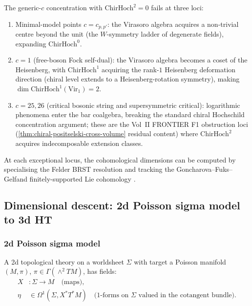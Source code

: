 \begin{remark}
\label{rem:vir-concentration-exceptions}
The generic-$c$ concentration with $\mathrm{ChirHoch}^2 = 0$ fails
at three loci:
\begin{enumerate}[label=\textup{(\alph*)}]
\item Minimal-model points $c = c_{p, p'}$: the Virasoro algebra
acquires a non-trivial centre beyond the unit \textup(the
$W$-symmetry ladder of degenerate fields\textup), expanding
$\mathrm{ChirHoch}^0$.
\item $c = 1$ \textup(free-boson Fock self-dual\textup): the
Virasoro algebra becomes a coset of the Heisenberg, with
$\mathrm{ChirHoch}^1$ acquiring the rank-$1$ Heisenberg deformation
direction \textup(chiral level extends to a Heisenberg-rotation
symmetry\textup), making
$\dim \mathrm{ChirHoch}^1(\mathrm{Vir}_1) = 2$.
\item $c = 25, 26$ \textup(critical bosonic string and supersymmetric
critical\textup): logarithmic phenomena enter the bar coalgebra,
breaking the standard chiral Hochschild concentration argument;
these are the Vol~II FRONTIER F1 obstruction loci
\textup(\cref{thm:chiral-positselski-cross-volume} residual
content\textup) where $\mathrm{ChirHoch}^2$ acquires
indecomposable extension classes.
\end{enumerate}
At each exceptional locus, the cohomological dimensions can be
computed by specialising the Felder BRST resolution
\cite{Felder1989} and tracking the Goncharova--Fuks--Gelfand
finitely-supported Lie cohomology
\cite{FuksGelfand1980,Goncharova1973}.
\end{remark}

\subsection{Dimensional descent: 2d Poisson sigma model to 3d HT}
\subsubsection{2d Poisson sigma model}
A 2d topological theory on a worldsheet $\Sigma$ with target a Poisson manifold $(M, \pi)$, $\pi \in \Gamma(\wedge^2 TM)$, has fields:
\begin{align}
X &: \Sigma \to M \quad \text{(maps)}, \\
\eta &\in \Omega^1(\Sigma, X^* T^*M) \quad \text{(1-forms on $\Sigma$ valued in the cotangent bundle)}.
\end{align}

